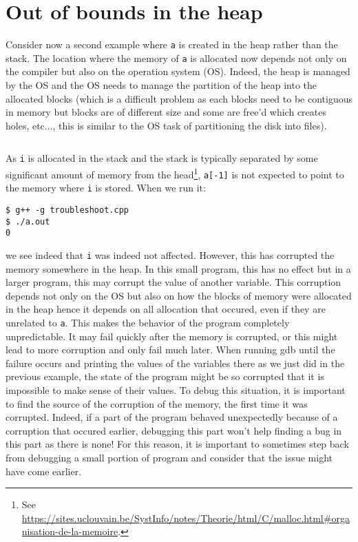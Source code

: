 \documentclass{article}
\begin{document}
\section{Out of bounds in the heap}

Consider now a second example where \texttt{a} is created in the heap rather than the stack.
The location where the memory of \texttt{a} is allocated now depends not only on the compiler but also on the operation system (OS).
Indeed, the heap is managed by the OS and the OS needs to manage the partition of the heap into the allocated blocks (which is a difficult problem as each blocks need to be contiguous in memory but blocks are of different size and some are free'd which creates holes, etc..., this is similar to the OS task of partitioning the disk into files).
\inputminted[linenos]{cpp}{troubleshoot2.cpp}
As \texttt{i} is allocated in the stack and the stack is typically separated by some significant amount of memory from the head\footnote{See \url{https://sites.uclouvain.be/SystInfo/notes/Theorie/html/C/malloc.html#organisation-de-la-memoire}.}, \texttt{a[-1]} is not expected to point to the memory where \texttt{i} is stored.
When we run it:
\begin{verbatim}
$ g++ -g troubleshoot.cpp
$ ./a.out
0
\end{verbatim}
we see indeed that \texttt{i} was indeed not affected. However, this has corrupted the memory somewhere in the heap.
In this small program, this has no effect but in a larger program, this may corrupt the value of another variable.
This corruption depends not only on the OS but also on how the blocks of memory were allocated in the heap hence it depends on all allocation that occured, even if they are unrelated to \texttt{a}.
This makes the behavior of the program completely unpredictable.
It may fail quickly after the memory is corrupted, or this might lead to more corruption and only fail much later.
When running gdb until the failure occurs and printing the values of the variables there as we just did in the previous example, the state of the program might be so corrupted that it is impossible to make sense of their values.
To debug this situation, it is important to find the source of the corruption of the memory,
the first time it was corrupted.
Indeed, if a part of the program behaved unexpectedly because of a corruption that occured earlier, debugging this part won't help finding a bug in this part as there is none!
For this reason, it is important to sometimes step back from debugging a small portion of program and consider that the issue might have come earlier.
\end{document}
